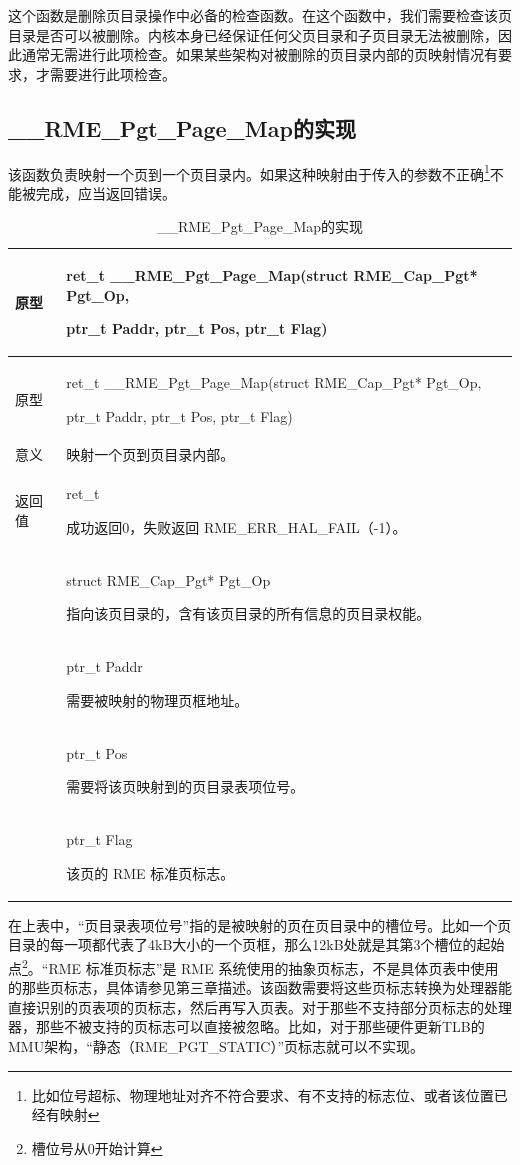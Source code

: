 这个函数是删除页目录操作中必备的检查函数。在这个函数中，我们需要检查该页目录是否可以被删除。内核本身已经保证任何父页目录和子页目录无法被删除，因此通常无需进行此项检查。如果某些架构对被删除的页目录内部的页映射情况有要求，才需要进行此项检查。

\subsection{\_\_RME\_Pgt\_Page\_Map的实现}\label{subsec:7-rme-pgt-page-map-implementation}

该函数负责映射一个页到一个页目录内。如果这种映射由于传入的参数不正确\footnote{比如位号超标、物理地址对齐不符合要求、有不支持的标志位、或者该位置已经有映射}不能被完成，应当返回错误。

\begin{xltabular}{\textwidth}{@{}>{\hsize\raggedright\arraybackslash}X>{\hsize\raggedright\arraybackslash}X@{}}
\caption{\_\_RME\_Pgt\_Page\_Map的实现}\label{tab:7-79-rme-pgt-page-map-implementation}\\
\toprule
原型\strut
 & ret\_t \_\_RME\_Pgt\_Page\_Map(struct RME\_Cap\_Pgt* Pgt\_Op,

ptr\_t Paddr, ptr\_t Pos, ptr\_t Flag)\strut
\tabularnewline
\endfirsthead
\toprule
原型\strut
 & ret\_t \_\_RME\_Pgt\_Page\_Map(struct RME\_Cap\_Pgt* Pgt\_Op,

ptr\_t Paddr, ptr\_t Pos, ptr\_t Flag)\strut
\tabularnewline
\midrule
\endhead
\bottomrule
\endlastfoot
意义 & 映射一个页到页目录内部。\tabularnewline
返回值\strut
 & ret\_t

成功返回0，失败返回 RME\_ERR\_HAL\_FAIL（-1）。\strut
\tabularnewline
{} & struct RME\_Cap\_Pgt* Pgt\_Op

指向该页目录的，含有该页目录的所有信息的页目录权能。\strut
\tabularnewline
\strut
 & ptr\_t Paddr

需要被映射的物理页框地址。\strut
\tabularnewline
\strut
 & ptr\_t Pos

需要将该页映射到的页目录表项位号。\strut
\tabularnewline
\strut
 & ptr\_t Flag

该页的 RME 标准页标志。\strut
\tabularnewline
\end{xltabular}

在上表中，``页目录表项位号''指的是被映射的页在页目录中的槽位号。比如一个页目录的每一项都代表了4kB大小的一个页框，那么12kB处就是其第3个槽位的起始点\footnote{槽位号从0开始计算}。``RME 标准页标志''是 RME 系统使用的抽象页标志，不是具体页表中使用的那些页标志，具体请参见第三章描述。该函数需要将这些页标志转换为处理器能直接识别的页表项的页标志，然后再写入页表。对于那些不支持部分页标志的处理器，那些不被支持的页标志可以直接被忽略。比如，对于那些硬件更新TLB的MMU架构，``静态（RME\_PGT\_STATIC）''页标志就可以不实现。

